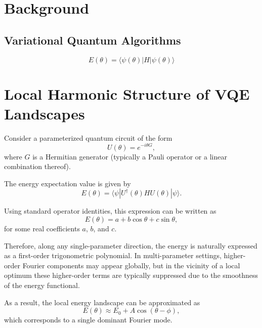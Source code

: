 \documentclass[12pt]{article}
\begin{document}
\section{Background}

\subsection{Variational Quantum Algorithms}

\begin{equation}
E(\theta) = \langle \psi(\theta) | H | \psi(\theta) \rangle
\end{equation}


\section{Local Harmonic Structure of VQE Landscapes}

Consider a parameterized quantum circuit of the form
\begin{equation}
U(\theta) = e^{-i \theta G},
\end{equation}
where $G$ is a Hermitian generator (typically a Pauli operator or a linear combination thereof).

The energy expectation value is given by
\begin{equation}
E(\theta) = \langle \psi | U^\dagger(\theta) H U(\theta) | \psi \rangle.
\end{equation}

Using standard operator identities, this expression can be written as
\begin{equation}
E(\theta) = a + b \cos\theta + c \sin\theta,
\end{equation}
for some real coefficients $a$, $b$, and $c$.

Therefore, along any single-parameter direction, the energy is naturally expressed as a first-order trigonometric polynomial. In multi-parameter settings, higher-order Fourier components may appear globally, but in the vicinity of a local optimum these higher-order terms are typically suppressed due to the smoothness of the energy functional.

As a result, the local energy landscape can be approximated as
\begin{equation}
E(\theta) \approx E_0 + A \cos(\theta - \phi),
\end{equation}
which corresponds to a single dominant Fourier mode.
\end{document}

